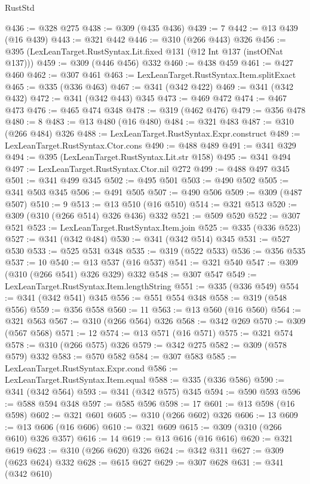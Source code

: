 \begin{lexlean}{RustStd}
\begin{coremodule}
{\begin{coremodule}
{{{{{@436 := @328 @275
@438 := @309 (@435 @436)
@439 := 7
@442 := @13 @439 (@16 @439)
@443 := @321 @442
@446 := @310 (@266 @443) @326
@456 := @395 (LexLeanTarget.RustSyntax.Lit.fixed @131 (@12 Int @137 (instOfNat @137)))
@459 := @309 (@446 @456) @332
@460 := @438 @459
@461 := @427 @460
@462 := @307 @461
@463 := LexLeanTarget.RustSyntax.Item.splitExact
@465 := @335 (@336 @463)
@467 := @341 (@342 @422)
@469 := @341 (@342 @432)
@472 := @341 (@342 @443) @345
@473 := @469 @472
@474 := @467 @473
@476 := @465 @474 @348
@478 := @319 (@462 @476)
@479 := @356 @478
@480 := 8
@483 := @13 @480 (@16 @480)
@484 := @321 @483
@487 := @310 (@266 @484) @326
@488 := LexLeanTarget.RustSyntax.Expr.construct
@489 := LexLeanTarget.RustSyntax.Ctor.cons
@490 := @488 @489
@491 := @341 @329
@494 := @395 (LexLeanTarget.RustSyntax.Lit.str @158)
@495 := @341 @494
@497 := LexLeanTarget.RustSyntax.Ctor.nil @272
@499 := @488 @497 @345
@501 := @341 @499 @345
@502 := @495 @501
@503 := @490 @502
@505 := @341 @503 @345
@506 := @491 @505
@507 := @490 @506
@509 := @309 (@487 @507)
@510 := 9
@513 := @13 @510 (@16 @510)
@514 := @321 @513
@520 := @309 (@310 (@266 @514) @326 @436) @332
@521 := @509 @520
@522 := @307 @521
@523 := LexLeanTarget.RustSyntax.Item.join
@525 := @335 (@336 @523)
@527 := @341 (@342 @484)
@530 := @341 (@342 @514) @345
@531 := @527 @530
@533 := @525 @531 @348
@535 := @319 (@522 @533)
@536 := @356 @535
@537 := 10
@540 := @13 @537 (@16 @537)
@541 := @321 @540
@547 := @309 (@310 (@266 @541) @326 @329) @332
@548 := @307 @547
@549 := LexLeanTarget.RustSyntax.Item.lengthString
@551 := @335 (@336 @549)
@554 := @341 (@342 @541) @345
@556 := @551 @554 @348
@558 := @319 (@548 @556)
@559 := @356 @558
@560 := 11
@563 := @13 @560 (@16 @560)
@564 := @321 @563
@567 := @310 (@266 @564) @326
@568 := @342 @269
@570 := @309 (@567 @568)
@571 := 12
@574 := @13 @571 (@16 @571)
@575 := @321 @574
@578 := @310 (@266 @575) @326
@579 := @342 @275
@582 := @309 (@578 @579) @332
@583 := @570 @582
@584 := @307 @583
@585 := LexLeanTarget.RustSyntax.Expr.cond
@586 := LexLeanTarget.RustSyntax.Item.equal
@588 := @335 (@336 @586)
@590 := @341 (@342 @564)
@593 := @341 (@342 @575) @345
@594 := @590 @593
@596 := @588 @594 @348
@597 := @585 @596
@598 := 17
@601 := @13 @598 (@16 @598)
@602 := @321 @601
@605 := @310 (@266 @602) @326
@606 := 13
@609 := @13 @606 (@16 @606)
@610 := @321 @609
@615 := @309 (@310 (@266 @610) @326 @357)
@616 := 14
@619 := @13 @616 (@16 @616)
@620 := @321 @619
@623 := @310 (@266 @620) @326
@624 := @342 @311
@627 := @309 (@623 @624) @332
@628 := @615 @627
@629 := @307 @628
@631 := @341 (@342 @610)
}}}}}
\end{coremodule}}
\end{coremodule}
\end{lexlean}
